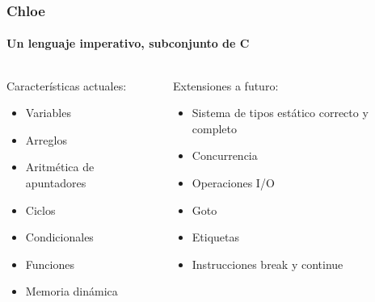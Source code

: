 \begin{frame}
\frametitle{Chloe}
\framesubtitle{Un lenguaje imperativo, subconjunto de C}

\begin{columns}[t]
\begin{block}{Características actuales:}
\pause
\begin{itemize}
\item{Variables}
\pause
\item{Arreglos}
\pause
\item{Aritmética de apuntadores}
\pause
\item{Ciclos}
\pause
\item{Condicionales}
\pause
\item{Funciones}
\pause
\item{Memoria dinámica}
\pause
\end{itemize}
\end{block}
\begin{block}{Extensiones a futuro:}
\begin{itemize}
\pause
\item{Sistema de tipos estático correcto y completo}
\pause
\item{Concurrencia}
\pause
\item{Operaciones I/O}
\pause
\item{Goto}
\pause
\item{Etiquetas}
\pause
\item{Instrucciones break y continue}
\end{itemize}
\pause
\end{block}
\end{columns}

\end{frame}


